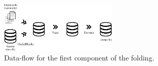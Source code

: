 \begin{figure}
  \centering
  \includegraphics[width=0.5\textwidth]{figures/user-guide/codeblocks-fuse-extract.pdf}
  \caption{Data-flow for the first component of the folding.}
  \label{fig:dataflow_1st_component_folding}
\end{figure}
